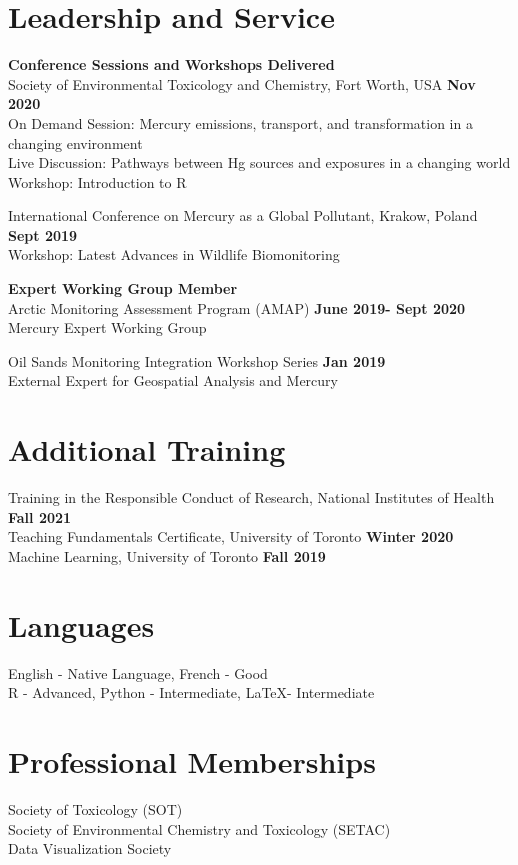 \documentclass[margin,line]{res}
\begin{document}
\begin{resume}
\vspace*{.1in}

\section{\sc Leadership and Service}
{\bf Conference Sessions and Workshops Delivered}\\
Society of Environmental Toxicology and Chemistry, Fort Worth, USA \hfill {\bf  Nov 2020}\\
On Demand Session: Mercury emissions, transport, and transformation in a changing environment\\
Live Discussion: Pathways between Hg sources and exposures in a changing world\\
Workshop: Introduction to R

International Conference on Mercury as a Global Pollutant, Krakow, Poland \hfill {\bf Sept 2019}\\
Workshop: Latest Advances in Wildlife Biomonitoring

{\bf Expert Working Group Member}\\
Arctic Monitoring Assessment Program (AMAP)
\hfill {\bf  June 2019- Sept 2020}\\
Mercury Expert Working Group

Oil Sands Monitoring Integration Workshop Series
\hfill {\bf  Jan 2019}\\
External Expert for Geospatial Analysis and Mercury

\vspace*{.1in}

\section{\sc Additional Training}
Training in the Responsible Conduct of Research, National Institutes of Health \hfill {\bf  Fall 2021}\\
Teaching Fundamentals Certificate, University of Toronto
\hfill {\bf  Winter 2020}\\
Machine Learning, University of Toronto
\hfill {\bf  Fall 2019}

\vspace*{.1in}

\section{\sc Languages}

English - Native Language, French - Good\\
R - Advanced, Python - Intermediate, LaTeX- Intermediate

\vspace*{.1in}

\section{\sc Professional Memberships}
Society of Toxicology (SOT)\\
Society of Environmental Chemistry and Toxicology (SETAC)\\
Data Visualization Society\\


\end{resume}
\end{document}
